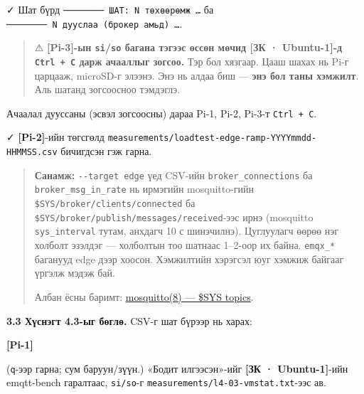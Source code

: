 ✓ Шат бүрд \texttt{────────\ ШАТ:\allowbreak{}\ N\ төхөөрөмж\ \ldots{}} ба \texttt{────────\ N\ дууслаа\ (брокер\ амьд)\ \ldots{}}.

\begin{quote}
⚠ \textbf{{[}Pi-3{]}-ын \texttt{si}/\allowbreak\texttt{so} багана тэгээс өссөн мөчид {[}ЗК · Ubuntu-1{]}-д \texttt{Ctrl\ +\ C} дарж ачааллыг зогсоо.} Тэр бол хязгаар. Цааш шахах нь Pi-г царцааж, microSD-г элээнэ. Энэ нь алдаа биш --- \textbf{энэ бол таны хэмжилт}. Аль шатанд зогсоосноо тэмдэглэ.
\end{quote}

Ачаалал дууссаны (эсвэл зогсоосны) дараа Pi-1, Pi-2, Pi-3-т \texttt{Ctrl\ +\ C}.

✓ \textbf{{[}Pi-2{]}}-ийн төгсгөлд \texttt{measurements/\allowbreak{}loadtest-edge-ramp-YYYYmmdd-HHMMSS.\allowbreak{}csv} бичигдсэн гэж гарна.

\begin{quote}
\textbf{Санамж:} \texttt{-\/-target\ edge} үед CSV-ийн \texttt{broker\_\allowbreak{}connections} ба \texttt{broker\_\allowbreak{}msg\_\allowbreak{}in\_\allowbreak{}rate} нь ирмэгийн mosquitto-гийн \texttt{\$SYS/\allowbreak{}broker/\allowbreak{}clients/\allowbreak{}connected} ба \texttt{\$SYS/\allowbreak{}broker/\allowbreak{}publish/\allowbreak{}messages/\allowbreak{}received}-ээс ирнэ (mosquitto \texttt{sys\_interval} тутам, анхдагч 10 с шинэчилнэ). Цуглуулагч өөрөө нэг холболт эзэлдэг --- холболтын тоо шатнаас 1--2-оор их байна. \texttt{emqx\_*} баганууд edge дээр хоосон. Хэмжилтийн хэрэгсэл юуг хэмжиж байгааг үргэлж мэдэж бай.

Албан ёсны баримт: \href{https://mosquitto.org/man/mosquitto-8.html}{mosquitto(8) --- \$SYS topics}.
\end{quote}

\textbf{3.3 Хүснэгт 4.3-ыг бөглө.} CSV-г шат бүрээр нь харах:

\textbf{{[}Pi-1{]}}

\begin{Shaded}
\begin{Highlighting}[]
\OperatorTok{\textless{}} \VariableTok{$(}\KeywordTok{|} \VariableTok{)} \KeywordTok{|} 
\end{Highlighting}
\end{Shaded}

(\texttt{q}-ээр гарна; сум баруун/зүүн.) «Бодит илгээсэн»-ийг \textbf{{[}ЗК · Ubuntu-1{]}}-ийн emqtt-bench гаралтаас, \texttt{si/so}-г \texttt{measurements/\allowbreak{}l4-03-vmstat.\allowbreak{}txt}-ээс ав.

